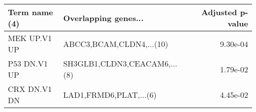 \begin{tabular}{llr}
\toprule
Term name (4) &         Overlapping genes... &  Adjusted p-value \\
\midrule
 MEK UP.V1 UP &     ABCC3,BCAM,CLDN4,...(10) &          9.30e-04 \\
 P53 DN.V1 UP & SH3GLB1,CLDN3,CEACAM6,...(8) &          1.79e-02 \\
 CRX DN.V1 DN &       LAD1,FRMD6,PLAT,...(6) &          4.45e-02 \\
\bottomrule
\end{tabular}
